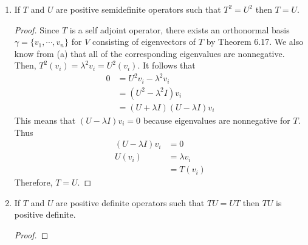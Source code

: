 \documentclass[11pt]{scrartcl}
\begin{document}
\begin{enumerate}[label=\alph*.]
{\begin{proof}
\begin{enumerate}[label=\roman*.]
{			            Consider $v \in V$ and the following inner product,
			            \begin{align*}
				            \langle L_A(v),v \rangle & =  \langle Av,v \rangle    \\
				                                     & = \langle B^*Bv,v \rangle  \\
				                                     & = B^* \langle Bv,v \rangle \\
				                                     & = \langle Bv,Bv \rangle    \\
				                                     & \geq 0
			            \end{align*}
			            Since $A = [T]_\beta$, $T$ is positive semidefinite.
			            }
		      \end{enumerate}
	      \end{proof}
	      }
	\item{
	      If $T$ and $U$ are positive semidefinite operators such that $T^2 = U^2$ then $T = U$.
	      \begin{proof}
		      Since $T$ is a self adjoint operator, there exists an orthonormal basis $\gamma = \{v_1, \cdots, v_n\}$ for $V$ consisting of
		      eigenvectors of $T$ by Theorem 6.17. We also know from (a) that all of the corresponding eigenvalues are nonnegative.
		      Then, $T^2(v_i) = \lambda^2 v_i = U^2(v_i)$. It follows that
		      \begin{align*}
			      0 & = U^2v_i - \lambda^2 v_i             \\
			        & = (U^2 - \lambda^2I) v_i             \\
			        & = (U + \lambda I)(U - \lambda I) v_i
		      \end{align*}
		      This means that $(U - \lambda I)v_i = 0$ because eigenvalues are nonnegative for $T$.
		      Thus
		      \begin{align*}
			      (U - \lambda I)v_i & = 0           \\
			      U(v_i)             & = \lambda v_i \\
			                         & = T(v_i)
		      \end{align*}
		      Therefore, $T = U$.
	      \end{proof}
	      }
	\item{
	      If $T$ and $U$ are positive definite operators such that $TU=UT$ then $TU$ is positive definite.
	      \begin{proof}

\end{proof}}
\end{enumerate}
\end{document}
